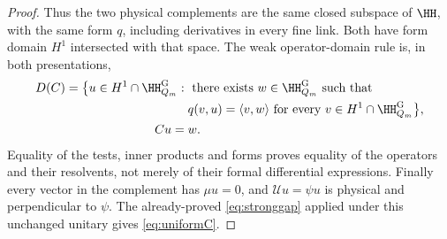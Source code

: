 \begin{proof}
Thus the two physical complements are the same closed subspace
of $\HH$, with the same form $q$, including derivatives in every
fine link. Both have form domain $H^1$ intersected with that space.
The weak operator-domain rule is, in both presentations,
\[
\begin{aligned}
 D(C)=\bigl\{u\in H^1\cap\HH_{Q_m}^{\rm G}:{}&
 \text{ there exists }w\in\HH_{Q_m}^{\rm G}\text{ such that}\\
 &q(v,u)=\langle v,w\rangle
 \text{ for every }v\in H^1\cap\HH_{Q_m}^{\rm G}\bigr\},\\
 Cu={}&w.
\end{aligned}
\]
Equality of the tests, inner products and forms proves equality
of the operators and their resolvents, not merely of their formal
differential expressions. Finally every vector in the complement
has $\mu u=0$, and $\mathcal Uu=\psi u$ is physical and perpendicular
to $\psi$. The already-proved \eqref{eq:stronggap} applied under
this unchanged unitary gives \eqref{eq:uniformC}.
\end{proof}

